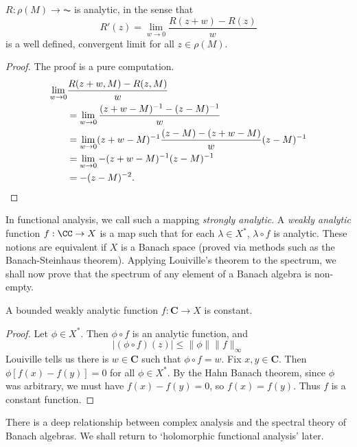 \begin{lemma}
    $R: \rho(M) \to \AC$ is analytic, in the sense that
    \[ R'(z) = \lim_{w \to 0} \frac{R(z + w) - R(z)}{w} \]
    is a well defined, convergent limit for all $z \in \rho(M)$.
\end{lemma}
\begin{proof}
    The proof is a pure computation.
    \begin{align*}
        \lim_{w \to 0} &\frac{R(z + w, M) - R(z,M)}{w}\\
        &= \lim_{w \to 0} \frac{(z + w - M)^{-1} - (z - M)^{-1}}{w}\\
        &= \lim_{w \to 0} (z + w - M)^{-1} \frac{(z - M) - (z + w - M)}{w} (z - M)^{-1}\\
        &= \lim_{w \to 0} -(z + w - M)^{-1} (z - M)^{-1}\\
        &= -(z - M)^{-2}. \qedhere
    \end{align*}
\end{proof}

In functional analysis, we call such a mapping \emph{strongly analytic}. A \emph{weakly analytic} function $f: \CC \to X$ is a map such that for each $\lambda \in X^*$, $\lambda \circ f$ is analytic. These notions are equivalent if $X$ is a Banach space (proved via methods such as the Banach-Steinhaus theorem). Applying Louiville's theorem to the spectrum, we shall now prove that the spectrum of any element of a Banach algebra is non-empty.

\begin{lemma}
    A bounded weakly analytic function $f: \mathbf{C} \to X$ is constant.
\end{lemma}
\begin{proof}
    Let $\phi \in X^*$. Then $\phi \circ f$ is an analytic function, and
    \[ | (\phi \circ f)(z) | \leq \| \phi \| \| f \|_\infty \]
    Louiville tells us there is $w \in \mathbf{C}$ such that $\phi \circ f = w$. Fix $x,y \in \mathbf{C}$. Then $\phi[f(x) - f(y)] = 0$ for all $\phi \in X^*$. By the Hahn Banach theorem, since $\phi$ was arbitrary, we must have $f(x) - f(y) = 0$, so $f(x) = f(y)$. Thus $f$ is a constant function.
\end{proof}

There is a deep relationship between complex analysis and the spectral theory of Banach algebras. We shall return to `holomorphic functional analysis' later.

